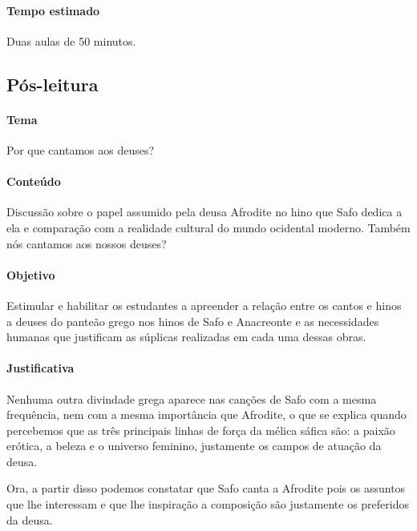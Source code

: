 \documentclass[12pt]{extarticle}
\begin{document}
\paragraph{Tempo estimado} Duas aulas de 50 minutos.




\subsection{Pós-leitura}

\paragraph{Tema} Por que cantamos aos deuses?

\paragraph{Conteúdo} Discussão sobre o papel assumido pela deusa Afrodite no hino que 
Safo dedica a ela e comparação com a realidade cultural do mundo ocidental moderno.
Também nós cantamos aos nossos deuses?

\paragraph{Objetivo} Estimular e habilitar os estudantes a apreender a relação
entre os cantos e hinos a deuses do panteão grego nos hinos de Safo e Anacreonte 
e as necessidades humanas que justificam as súplicas realizadas em cada uma
dessas obras. 

\paragraph{Justificativa} Nenhuma outra divindade grega aparece nas canções de Safo
com a mesma frequência, nem com a mesma importância que Afrodite, o que se explica
quando percebemos que as três principais linhas de força da mélica sáfica são:
a paixão erótica, a beleza e o universo feminino, justamente os campos de atuação da deusa.

Ora, a partir disso podemos constatar que Safo canta a Afrodite pois os assuntos
que lhe interessam e que lhe inspiração a composição são justamente os preferidos
da deusa. 
\end{document}
